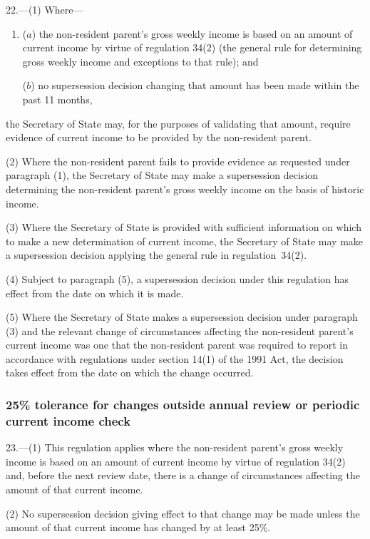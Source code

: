 \documentclass[12pt,a4paper]{article}
\begin{document}
22.---(1)  Where—
\begin{enumerate}\item[]
($a$) the non-resident parent’s gross weekly income is based on an amount of current income by virtue of regulation 34(2) (the general rule for determining gross weekly income and exceptions to that rule); and

($b$) no supersession decision changing that amount has been made within the past 11 months,
\end{enumerate}
the Secretary of State may, for the purposes of validating that amount, require evidence of current income to be provided by the non-resident parent.

(2) Where the non-resident parent fails to provide evidence as requested under paragraph (1), the Secretary of State may make a supersession decision determining the non-resident parent’s gross weekly income on the basis of historic income.

(3) Where the Secretary of State is provided with sufficient information on which to make a new determination of current income, the Secretary of State may make a supersession decision applying the general rule in regulation~34(2).

(4) Subject to paragraph (5), a supersession decision under this regulation has effect from the date on which it is made.

(5) Where the Secretary of State makes a supersession decision under paragraph (3) and the relevant change of circumstances affecting the non-resident parent’s current income was one that the non-resident parent was required to report in accordance with regulations under section 14(1) of the 1991 Act, the decision takes effect from the date on which the change occurred.

\subsubsection[23. 25\% tolerance for changes outside annual review or periodic current income check]{25\% tolerance for changes outside annual review or periodic current income check}

23.---(1)  This regulation applies where the non-resident parent’s gross weekly income is based on an amount of current income by virtue of regulation 34(2) and, before the next review date, there is a change of circumstances affecting the amount of that current income.

(2) No supersession decision giving effect to that change may be made unless the amount of that current income has changed by at least 25\%.
\end{document}
